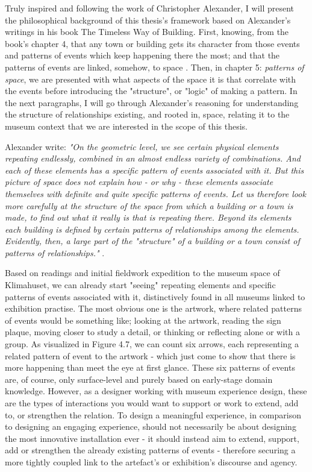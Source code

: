 Truly inspired and following the work of Christopher Alexander, I will present the philosophical background of this thesis's framework based on Alexander's writings in his book The Timeless Way of Building. First, knowing, from the book's chapter 4, that any town or building gets its character from those events and patterns of events which keep happening there the most; and that the patterns of events are linked, somehow, to space \autocite[p. 81]{Alexander_book}. Then, in chapter 5: \textit{patterns of space}, we are presented with what aspects of the space it is that correlate with the events before introducing the "structure", or "logic" of making a pattern. In the next paragraphs, I will go through Alexander's reasoning for understanding the structure of relationships existing, and rooted in, space, relating it to the museum context that we are interested in the scope of this thesis.

Alexander write: \emph{"On the geometric level, we see certain physical elements repeating endlessly, combined in an almost endless variety of combinations. And each of these elements has a specific pattern of events associated with it. But this picture of space does not explain how - or why - these elements associate themselves with definite and quite specific patterns of events. Let us therefore look more carefully at the structure of the space from which a building or a town is made, to find out what it really is that is repeating there. Beyond its elements each building is defined by certain patterns of relationships among the elements. Evidently, then, a large part of the "structure" of a building or a town consist of patterns of relationships."} \autocite[p. 82-83]{Alexander_book}.

Based on readings and initial fieldwork expedition to the museum space of Klimahuset, we can already start "seeing" repeating elements and specific patterns of events associated with it, distinctively found in all museums linked to exhibition practise. The most obvious one is the artwork, where related patterns of events would be something like; looking at the artwork, reading the sign plaque, moving closer to study a detail, or thinking or reflecting alone or with a group. As visualized in Figure 4.7, we can count six arrows, each representing a related pattern of event to the artwork - which just come to show that there is more happening than meet the eye at first glance. These six patterns of events are, of course, only surface-level and purely based on early-stage domain knowledge. However, as a designer working with museum experience design, these are the types of interactions you would want to support or work to extend, add to, or strengthen the relation. To design a meaningful experience, in comparison to designing an engaging experience, should not necessarily be about designing the most innovative installation ever - it should instead aim to extend, support, add or strengthen the already existing patterns of events - therefore securing a more tightly coupled link to the artefact's or exhibition's discourse and agency.


